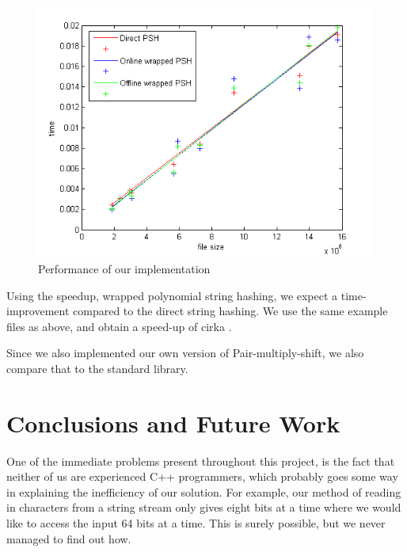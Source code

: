 \documentclass[]{article}
\newcommand{\funk}[1]{\small\texttt{#1}}
\newcommand{\cpp}{C+\!+\xspace}
\begin{document}



\begin{figure}[H]
	\centering
	\includegraphics[width = \textwidth]{./DirectOnlineOffline.png}
	\caption{Performance of our implementation}
	\label{fig:directpoly}
\end{figure}

Using the speedup, wrapped polynomial string hashing, we expect a time-improvement compared to the direct string hashing. We use the same example files as above, and obtain a speed-up of cirka . %

Since we also implemented our own version of Pair-multiply-shift, we also compare that to the standard library. 

\section{Conclusions and Future Work}

One of the immediate problems present throughout this project, is the fact that neither of us are experienced \cpp programmers, which probably goes some way in explaining the inefficiency of our solution. For example, our method of reading in characters from a string stream only gives eight bits at a time where we would like to access the input 64 bits at a time. This is surely possible, but we never managed to find out how.
\end{document}
